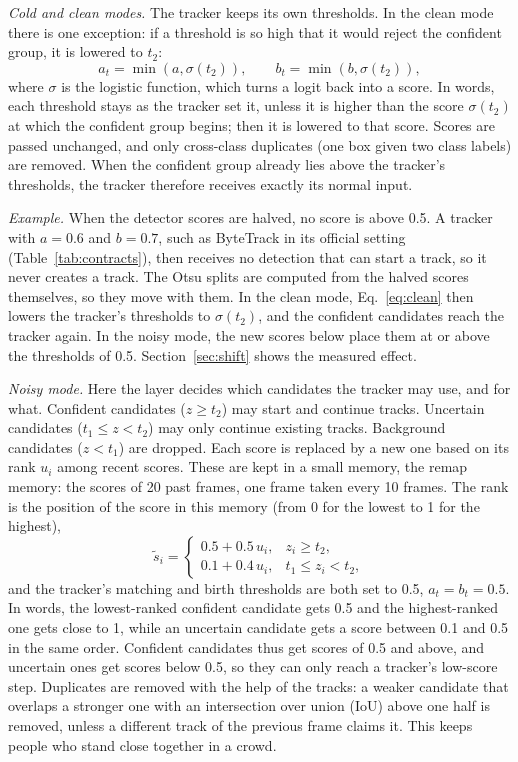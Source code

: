 \emph{Cold and clean modes.} The tracker keeps its own thresholds. In the
clean mode there is one exception: if a threshold is so high that it would
reject the confident group, it is lowered to $t_2$:
\begin{equation}
a_t=\min\!\left(a,\sigma(t_2)\right),\qquad b_t=\min\!\left(b,\sigma(t_2)\right),
\label{eq:clean}
\end{equation}
where $\sigma$ is the logistic function, which turns a logit back into a
score. In words, each threshold stays as the tracker set it, unless it is
higher than the score $\sigma(t_2)$ at which the confident group begins; then
it is lowered to that score. Scores are passed unchanged, and only cross-class duplicates (one box
given two class labels) are removed. When the confident group already lies
above the tracker's thresholds, the tracker therefore receives exactly its
normal input.

\emph{Example.} When the detector scores are halved, no score is above 0.5.
A tracker with $a=0.6$ and $b=0.7$, such as ByteTrack in its official setting
(Table~\ref{tab:contracts}), then receives no detection that can start a
track, so it never creates a track. The Otsu splits are computed from the
halved scores themselves, so they move with them. In the clean mode,
Eq.~\eqref{eq:clean} then lowers the tracker's thresholds to $\sigma(t_2)$,
and the confident candidates reach the tracker again. In the noisy mode, the
new scores below place them at or above the thresholds of 0.5.
Section~\ref{sec:shift} shows the measured effect.

\emph{Noisy mode.} Here the layer decides which candidates the tracker may
use, and for what. Confident candidates ($z\ge t_2$) may start and continue
tracks. Uncertain candidates ($t_1\le z<t_2$) may only continue existing
tracks. Background candidates ($z<t_1$) are dropped. Each score is replaced
by a new one based on its rank $u_i$ among recent scores. These are kept in a
small memory, the remap memory: the scores of 20 past frames, one frame taken
every 10 frames. The rank is the position of the score in this memory (from 0 for the
lowest to 1 for the highest),
\begin{equation}
\tilde{s}_i=
\begin{cases}
0.5+0.5\,u_i, & z_i\ge t_2,\\
0.1+0.4\,u_i, & t_1\le z_i<t_2,
\end{cases}
\label{eq:remap}
\end{equation}
and the tracker's matching and birth thresholds are both set to 0.5,
$a_t=b_t=0.5$. In words, the lowest-ranked confident candidate gets 0.5 and
the highest-ranked one gets close to 1, while an uncertain candidate gets a
score between 0.1 and 0.5 in the same order. Confident candidates thus get
scores of 0.5 and above, and
uncertain ones get scores below 0.5, so they can only reach a tracker's
low-score step. Duplicates are removed with the help of the tracks: a weaker
candidate that overlaps a stronger one with an intersection over union (IoU)
above one half is removed, unless a different track of the previous frame
claims it. This keeps people who stand close together in a crowd.

